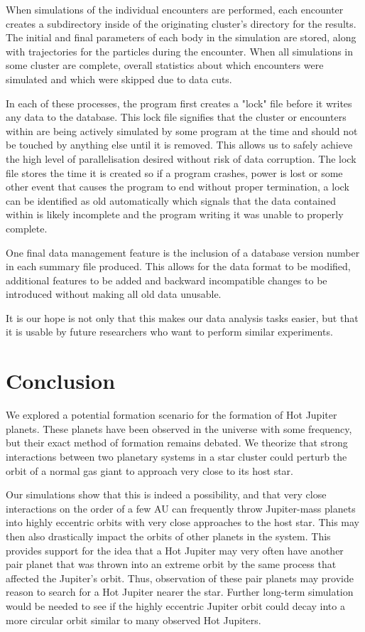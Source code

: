 \documentclass[12pt]{article}
\begin{document}
    When simulations of the individual encounters are performed, each encounter
    creates a subdirectory inside of the originating cluster's directory for the 
    results. 
    The initial and final parameters of each body in the simulation are stored, along
    with trajectories for the particles during the encounter. When all simulations
    in some cluster are complete, overall statistics about which encounters were
    simulated and which were skipped due to data cuts.

    In each of these processes, the program first creates a "lock" file before it
    writes any data to the database. This lock file signifies that the cluster or
    encounters within are being actively simulated by some program at the time and
    should not be touched by anything else until it is removed. This allows us to
    safely achieve the high level of parallelisation desired without risk of data
    corruption. The lock file stores the time it is created so if a program
    crashes, power is lost or some other event that causes the program to end without
    proper termination, a lock can be identified as old automatically which 
    signals that the data contained within is likely incomplete and the program
    writing it was unable to properly complete.

    One final data management feature is the inclusion of a database version number
    in each summary file produced. This allows for the data format to be modified,
    additional features to be added and backward incompatible changes to be introduced
    without making all old data unusable. 

    It is our hope is not only that this makes our data analysis tasks easier, but
    that it is usable by future researchers who want to perform similar experiments.

\section{Conclusion}

We explored a potential formation scenario for the formation of Hot Jupiter
planets. These planets have been observed in the universe with some frequency,
but their exact method of formation remains debated. 
We theorize that strong interactions between two planetary systems in a star
cluster could perturb the orbit of a normal gas giant to approach very close to
its host star. 

Our simulations show that this is indeed a possibility, and that very close
interactions on the order of a few AU can frequently throw Jupiter-mass planets into
highly eccentric orbits with very close approaches to the host star. 
This may then also drastically impact the orbits of other planets
in the system. This provides support for the idea that a Hot Jupiter may very
often have another pair planet that was thrown into an extreme orbit by the same
process that affected the Jupiter's orbit. Thus,
observation of these pair planets may provide reason to search for a Hot Jupiter
nearer the star.
Further long-term simulation would be needed to see if the highly eccentric Jupiter
orbit could decay into a more circular orbit similar to many observed Hot Jupiters.
\end{document}
